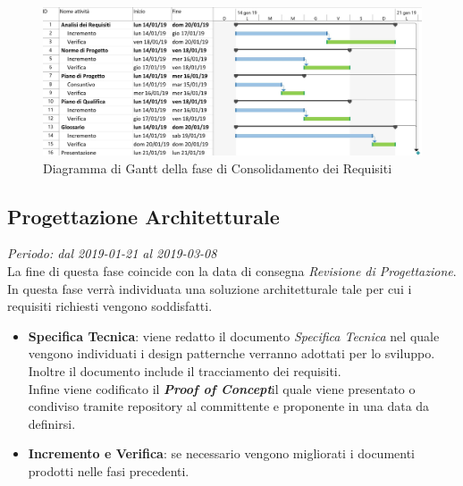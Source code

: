 \begin{figure}[H]
	\label{fig:gantt_con}
	\includegraphics[scale=0.6]{res/images/gantt_cons.jpg}
	\caption{Diagramma di Gantt della fase di Consolidamento dei Requisiti}
\end{figure}

\subsection{Progettazione Architetturale}
\textit{Periodo: dal 2019-01-21 al 2019-03-08} \\
La fine di questa fase coincide con la data di consegna \textit{Revisione di 
Progettazione}. In questa fase verrà individuata una soluzione architetturale 
tale per cui i requisiti richiesti vengono soddisfatti.
\begin{itemize}
	\item \textbf{Specifica Tecnica}: viene redatto il documento 
	\textit{Specifica Tecnica} nel quale vengono individuati i design 
	pattern\glosp che verranno adottati per lo sviluppo. Inoltre il documento 
	include il tracciamento dei requisiti.\\
	Infine viene codificato il \textbf{\textit{Proof of Concept}}\glosp il 
	quale viene presentato o condiviso tramite repository al committente e 
	proponente in una data da definirsi.
	\item \textbf{Incremento e Verifica}: se necessario vengono migliorati i 
	documenti prodotti nelle fasi precedenti.
\end{itemize}



